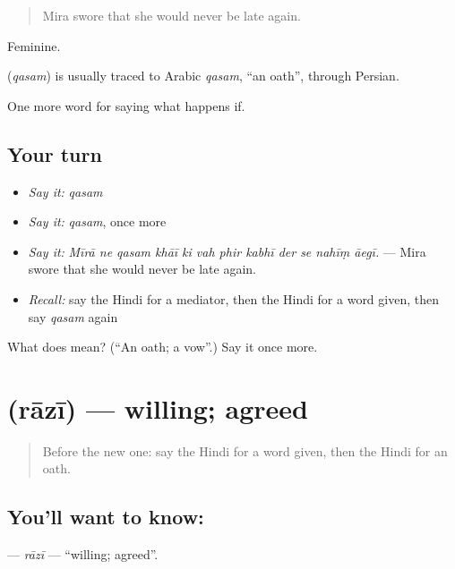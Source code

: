 \begin{quote}
Mira swore that she would never be late again.
\end{quote}

Feminine.

\begin{cousinweb}
\textbf{} (\emph{qasam}) is usually traced to Arabic \emph{qasam}, \textquotedblleft{}an oath\textquotedblright{}, through Persian.
\end{cousinweb}

\begin{grammarlens}[title={What you've built}]
One more word for saying what happens if.
\end{grammarlens}

\subsection*{Your turn}
\begin{itemize}
\raggedright
  \item \emph{Say it:} \emph{qasam}
  \item \emph{Say it:} \emph{qasam}, once more
  \item \emph{Say it:} \emph{Mīrā ne qasam khāī ki vah phir kabhī der se nahīṃ āegī.} — Mira swore that she would never be late again.
  \item \emph{Recall:} say the Hindi for a mediator, then the Hindi for a word given, then say \emph{qasam} again
\end{itemize}

\begin{tcolorbox}[breakable,colback=teal!4,colframe=teal!35!black,title={Before you move on}]
What does  mean? (\textquotedblleft{}An oath; a vow\textquotedblright{}.) Say it once more.
\end{tcolorbox}
\section[\texorpdfstring{\hi{राज़ी} (rāzī)}{राज़ी (rāzī)}]{ (rāzī) — willing; agreed}

\label{lesson:HI-C543-razi}



\begin{quote}
Before the new one: say the Hindi for a word given, then the Hindi for an oath.
\end{quote}

\subsection*{You'll want to know: }
\textbf{} — \emph{rāzī} — \textquotedblleft{}willing; agreed\textquotedblright{}.

